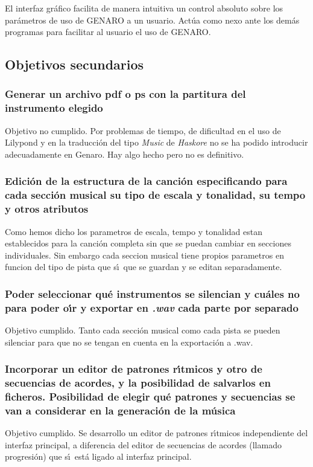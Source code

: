 \documentclass[a4paper,11pt]{article}
\begin{document}
El interfaz gr\'afico facilita de manera intuitiva un control absoluto sobre los par\'ametros de uso de GENARO a un usuario. Act\'ua como nexo ante los dem\'as programas para facilitar al usuario el uso de GENARO.

\subsection{Objetivos secundarios}

\subsubsection{Generar un archivo pdf o ps con la partitura del instrumento elegido}
Objetivo no cumplido. Por problemas de tiempo, de dificultad en el uso de Lilypond y en la traducci\'on
del tipo \emph{Music} de \emph{Haskore} no se ha podido introducir adecuadamente en Genaro. Hay algo
hecho pero no es definitivo.

\subsubsection{Edici\'on de la estructura de la canci\'on especificando para cada secci\'on musical su tipo de escala y tonalidad, su tempo y otros atributos}
Como hemos dicho los parametros de escala, tempo y tonalidad estan establecidos para la canci\'on completa sin que se puedan cambiar en secciones individuales. Sin embargo cada seccion musical tiene propios parametros en funcion del tipo de pista que s\'\i ~que se guardan y se editan separadamente.

\subsubsection {Poder seleccionar qu\'e instrumentos se silencian y cu\'ales no para poder o\'\i r y exportar en \emph{.wav} cada parte por separado}

Objetivo cumplido. Tanto cada secci\'on musical como cada pista se pueden silenciar para que no se tengan
en cuenta en la exportaci\'on a .wav.

\subsubsection{Incorporar un editor de patrones r\'\i tmicos y otro de secuencias de acordes, y la posibilidad de salvarlos en ficheros. Posibilidad de elegir qu\'e patrones y secuencias se van a considerar en la generaci\'on de la m\'usica}
Objetivo cumplido. Se desarrollo un editor de patrones r\'\i tmicos independiente del interfaz principal, a diferencia del editor de secuencias de acordes (llamado progresi\'on) que s\'\i ~est\'a ligado al interfaz principal.
\end{document}
